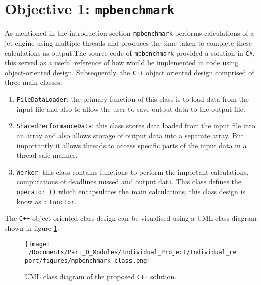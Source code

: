 \section{Objective 1: \texttt{mpbenchmark}}
As mentioned in the introduction section \texttt{mpbenchmark} performs calculations of a jet engine using multiple threads and produces the time taken to complete these calculations as output.The source code of \texttt{mpbenchmark} provided a solution in \texttt{C\#}, this served as a useful reference of how would be implemented in code using object-oriented design. Subsequently, the \texttt{C++} object oriented design comprised of three main classes:

\begin{enumerate}
	\item \texttt{FileDataLoader}: the primary function of this class is to load data from the input file and also to allow the user to save output data to the output file.
	\item \texttt{SharedPerformanceData}: this class stores data loaded from the input file into an array and also allows storage of output data into a separate array. But importantly it allows threads to access specific parts of the input data in a thread-safe manner. 
	\item \texttt{Worker}: this class contains functions to perform the important calculations, computations of deadlines missed and output data. This class defines the \texttt{operator ()} which encapsulates the main calculations, this class design is know as a \texttt{Functor}.
\end{enumerate}

The \texttt{C++} object-oriented class design can be visualised using a UML class diagram shown in figure \ref{fig:mpbenchmark_UML_diagram}.

\begin{figure}[H] %
	\centering
	\texttt{[image: ~/Documents/Part\_D\_Modules/Individual\_Project/Individual\_report/figures/mpbenchmark\_class.png]} %
	\caption{UML class diagram of the proposed \texttt{C++} solution.}
	\label{fig:mpbenchmark_UML_diagram} %
\end{figure}

